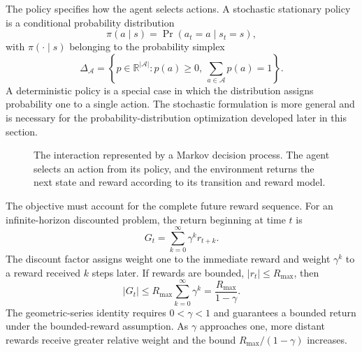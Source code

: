 The policy specifies how the agent selects actions. A stochastic stationary
policy is a conditional probability distribution
\begin{equation}
    \pi(a\mid s)
    =\Pr(a_t=a\mid s_t=s),
    \label{eq:rl-policy}
\end{equation}
with $\pi(\cdot\mid s)$ belonging to the probability simplex
\begin{equation}
    \Delta_{\mathcal{A}}
    =\left\{p\in\mathbb{R}^{|\mathcal{A}|}:
    p(a)\geq0,\ \sum_{a\in\mathcal{A}}p(a)=1\right\}.
    \label{eq:rl-probability-simplex}
\end{equation}
A deterministic policy is a special case in which the distribution assigns
probability one to a single action. The stochastic formulation is more general
and is necessary for the probability-distribution optimization developed
later in this section.

\begin{figure}[htbp]
    \centering
    \resizebox{\textwidth}{!}{}
    \caption{The interaction represented by a Markov decision process. The agent
    selects an action from its policy, and the environment returns the next
    state and reward according to its transition and reward model.}
    \label{fig:rl-mdp-loop}
\end{figure}

The objective must account for the complete future reward sequence. For an
infinite-horizon discounted problem, the return beginning at time $t$ is
\begin{equation}
    G_t=\sum_{k=0}^{\infty}\gamma^k r_{t+k}.
    \label{eq:rl-return}
\end{equation}
The discount factor assigns weight one to the immediate reward and weight
$\gamma^k$ to a reward received $k$ steps later. If rewards are bounded,
$|r_t|\leq R_{\max}$, then
\begin{equation}
    |G_t|
    \leq R_{\max}\sum_{k=0}^{\infty}\gamma^k
    =\frac{R_{\max}}{1-\gamma}.
    \label{eq:rl-return-bound}
\end{equation}
The geometric-series identity requires $0<\gamma<1$ and guarantees a bounded
return under the bounded-reward assumption. As $\gamma$ approaches one, more
distant rewards receive greater relative weight and the bound
$R_{\max}/(1-\gamma)$ increases.

